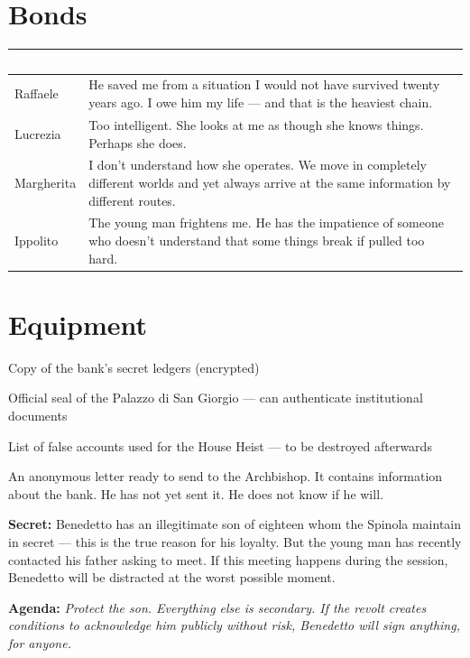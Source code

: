 \section*{Bonds}
\begin{table}[h]\centering\renewcommand{\arraystretch}{1.4}
\begin{tabularx}{\linewidth}{@{}L{2.6cm} X@{}}
\toprule{}
\textcolor{white}{\textbf{PC}} & \textcolor{white}{\textbf{Bond}} \\
\midrule
Raffaele & He saved me from a situation I would not have survived twenty years ago. I owe him my life --- and that is the heaviest chain. \\
Lucrezia & Too intelligent. She looks at me as though she knows things. Perhaps she does. \\
Margherita & I don't understand how she operates. We move in completely different worlds and yet always arrive at the same information by different routes. \\
Ippolito & The young man frightens me. He has the impatience of someone who doesn't understand that some things break if pulled too hard. \\
\bottomrule
\end{tabularx}
\end{table}

\section*{Equipment}
\begin{goldlist}
\item Copy of the bank's secret ledgers (encrypted)
\item Official seal of the Palazzo di San Giorgio --- can authenticate institutional documents
\item List of false accounts used for the House Heist --- to be destroyed afterwards
\item An anonymous letter ready to send to the Archbishop. It contains information about the bank. He has not yet sent it. He does not know if he will.
\end{goldlist}

\clearpage
\begin{secretbox}
\textbf{Secret:} Benedetto has an illegitimate son of eighteen whom the Spinola
maintain in secret --- this is the true reason for his loyalty. But the young man
has recently contacted his father asking to meet. If this meeting happens during
the session, Benedetto will be distracted at the worst possible moment.

\medskip\noindent\textcolor{SecretRed}{\textbf{Agenda:}} \textit{Protect the son.
Everything else is secondary. If the revolt creates conditions to acknowledge him
publicly without risk, Benedetto will sign anything, for anyone.}
\end{secretbox}

